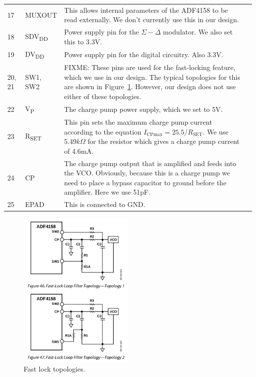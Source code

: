 \begin{tabularx}{\textwidth}{l l X>{\raggedright\arraybackslash}X}
  17 & MUXOUT & This allows internal parameters of the ADF4158 to be read externally. We don't
                currently use this in our design. \\
  18 & SDV\textsubscript{DD} & Power supply pin for the $\Sigma-\Delta$ modulator. We also set this
                               to 3.3V. \\
  19 & DV\textsubscript{DD} & Power supply pin for the digital circuitry. Also 3.3V. \\
  20, 21 & SW1, SW2 & FIXME: These pins are used for the fast-locking feature, which we use in our
                      design. The typical topologies for this are shown in
                      Figure~\ref{fig:adf4158-fast-lock}. However, our design does not use either of
                      these topologies. \\
  22 & V\textsubscript{P} & The charge pump power supply, which we set to 5V. \\
  23 & R\textsubscript{SET} & This pin sets the maximum charge pump current according to the
                              equation $I_{\text{CPmax}}=25.5/R_{\text{SET}}$. We use
                              5.49$\si{k\Omega}$ for the resistor which gives a charge pump current
                              of 4.6mA. \\
  24 & CP & The charge pump output that is amplified and feeds into the VCO. Obviously, because this
            is a charge pump we need to place a bypass capacitor to ground before the
            amplifier. Here we use 51pF. \\
  25 & EPAD & This is connected to GND. \\

  \bottomrule
\end{tabularx}

\begin{figure}[h]
  \centering
  \includegraphics[width=0.5\textwidth]{data/adf4158-fast-lock.png}
  \caption{Fast lock topologies.}
  \label{fig:adf4158-fast-lock}
\end{figure}

